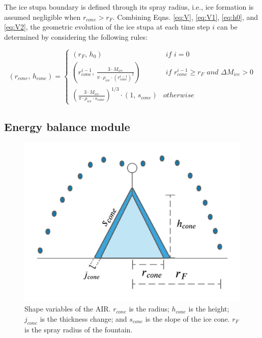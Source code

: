 The ice stupa boundary is defined through its spray radius, i.e., ice formation is assumed negligible when
$r_{cone} > r_{F}$. Combining Eqns. \ref{eq:V},  \ref{eq:V1}, \ref{eq:h0}, and \ref{eq:V2}, the geometric
evolution of the ice stupa at each time step $i$ can be determined by considering the following rules:

\begin{equation} (r_{cone},\, h_{cone}) = \left\{ \begin{array}{ll} (r_F ,\, h_0)                                                                          & \textit{ if } i=0 \\
             (r_{cone}^{i-1},\, \frac{3 \cdot M_{ice}}{\pi \cdot \rho_{ice} \cdot {(r_{cone}^{i-1})}^2}) & \textit{ if }
             r_{cone}^{i-1} \geq r_{F} \textit{ and } \Delta M_{ice} > 0                                                     \\ (\frac{3 \cdot M_{ice}}{\pi \cdot \rho_{ice} \cdot s_{cone}})^{1/3} \cdot (1,\,  s_{cone}) &
             otherwise\end{array} \right.  \label{eq:A2} \end{equation}

\subsection{Energy balance module} \label{sec:energy}

\begin{figure}
	\begin{center}
		\includegraphics[width=10 cm]{figs/AIR_schematic.jpeg}
	\end{center}
	\caption{Shape variables of the \ac{AIR}. $r_{cone}$ is the radius; $h_{cone}$ is the height; $j_{cone}$ is the
		thickness change; and $s_{cone}$ is the slope of the ice cone. $r_F$ is the spray radius of the fountain.}
	\label{fig:shape}
\end{figure}

